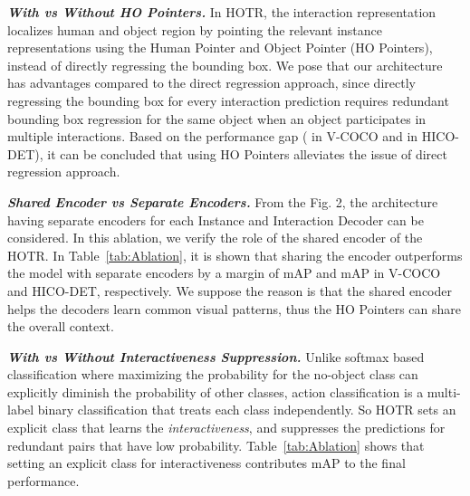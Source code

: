 \documentclass[final]{cvpr}
\begin{document}
\noindent\textit{\textbf{With vs Without HO Pointers.}}
In HOTR, the interaction representation localizes human and object region by pointing the relevant instance representations using the Human Pointer and Object Pointer (HO Pointers), instead of directly regressing the bounding box.
We pose that our architecture has advantages compared to the direct regression approach, since directly regressing the bounding box for every interaction prediction requires redundant bounding box regression for the same object when an object participates in multiple interactions.
Based on the performance gap ( in V-COCO and  in HICO-DET), it can be concluded that using HO Pointers alleviates the issue of direct regression approach.
\newline

\noindent\textit{\textbf{Shared Encoder vs Separate Encoders.}}
From the Fig. 2, the architecture having separate encoders for each Instance and Interaction Decoder can be considered.
In this ablation, we verify the role of the shared encoder of the HOTR.
In Table~\ref{tab:Ablation}, it is shown that sharing the encoder outperforms the model with separate encoders by a margin of mAP and mAP in V-COCO and HICO-DET, respectively.
We suppose the reason is that the shared encoder helps the decoders learn common visual patterns, thus the HO Pointers can share the overall context.
\newline

\noindent\textit{\textbf{With vs Without Interactiveness Suppression.}}
Unlike softmax based classification where maximizing the probability for the no-object class can explicitly diminish the probability of other classes, action classification is a multi-label binary classification that treats each class independently.
So HOTR sets an explicit class that learns the \textit{interactiveness}, and suppresses the predictions for redundant pairs that have low probability.
Table~\ref{tab:Ablation} shows that setting an explicit class for interactiveness contributes mAP to the final performance.
\newline
\end{document}
